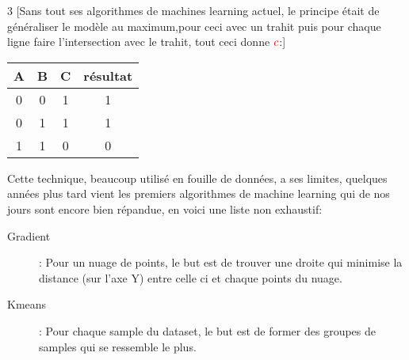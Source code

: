 \begin{center}
\begin{multicols}{3}
[Sans tout ses algorithmes de machines learning actuel, le principe était de généraliser le modèle au maximum,pour ceci avec un trahit puis pour chaque ligne faire l'intersection avec le trahit, tout ceci donne $\textcolor{red}{c}$:]

\begin{tabular}{ccc|c}
A & B & C & résultat \\
\hline
0 & 0 & 1 & 1\\
0 & 1 & 1 & 1\\
1 & 1 & 0 & 0\\
\end{tabular}
\end{multicols}
\end{center}

Cette technique, beaucoup utilisé en fouille de données, a ses limites, quelques années plus tard vient les premiers algorithmes de machine learning qui de nos jours sont encore bien répandue, en voici une liste non exhaustif:

\begin{description}
\item[Gradient]: Pour un nuage de points, le but est de trouver une droite qui minimise la distance (sur l'axe Y) entre celle ci et chaque  points du nuage.
\item[Kmeans]: Pour chaque sample du dataset, le but est de former des groupes de samples qui se ressemble le plus.
\end{description}

